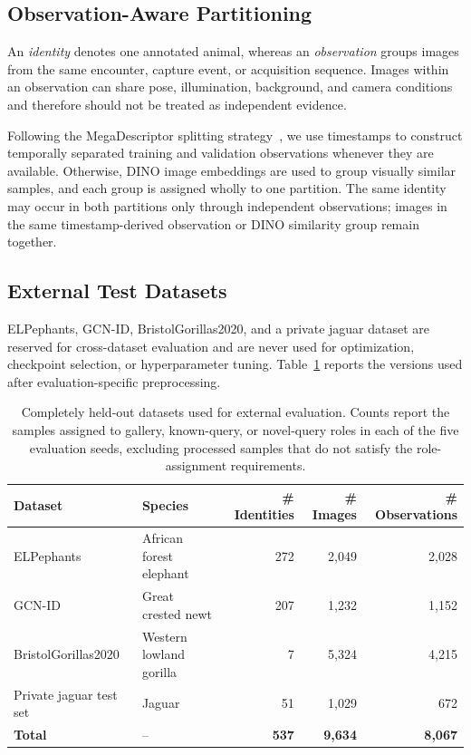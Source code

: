 \subsection{Observation-Aware Partitioning}
\label{sec:dataset:partitioning}

An \emph{identity} denotes one annotated animal, whereas an
\emph{observation} groups images from the same encounter, capture event, or
acquisition sequence. Images within an observation can share pose,
illumination, background, and camera conditions and therefore should not be
treated as independent evidence.

Following the MegaDescriptor splitting strategy~\cite{vcermak2024wildlifedatasets},
we use timestamps to construct temporally separated training and validation
observations whenever they are available. Otherwise, DINO image embeddings are
used to group visually similar samples, and each group is assigned wholly to
one partition. The same identity may occur in both partitions only through
independent observations; images in the same timestamp-derived observation or
DINO similarity group remain together.

\subsection{External Test Datasets}
\label{sec:dataset:test}

ELPephants, GCN-ID, BristolGorillas2020, and a private jaguar dataset are
reserved for cross-dataset evaluation and are never used for optimization,
checkpoint selection, or hyperparameter tuning.
Table~\ref{tab:apexid_test_datasets} reports the versions used after
evaluation-specific preprocessing.

\begin{table}[t]
\centering
\caption{Completely held-out datasets used for external evaluation. Counts
report the samples assigned to gallery, known-query, or novel-query roles in
each of the five evaluation seeds, excluding processed samples that do not
satisfy the role-assignment requirements.}
\label{tab:apexid_test_datasets}
\begin{tabular}{l l r r r}
\toprule
\textbf{Dataset} & \textbf{Species} & \textbf{\# Identities} &
\textbf{\# Images} & \textbf{\# Observations} \\
\midrule
ELPephants~\cite{korschens2019elpephants} & African forest elephant & 272 & 2,049 & 2,028 \\
GCN-ID~\cite{rosa2025gcnid} & Great crested newt & 207 & 1,232 & 1,152 \\
BristolGorillas2020~\cite{brookes2021bristolgorillas2020,brookes2021gorillas} & Western lowland gorilla & 7 & 5,324 & 4,215 \\
Private jaguar test set & Jaguar & 51 & 1,029 & 672 \\
\midrule
\textbf{Total} & -- & \textbf{537} & \textbf{9,634} & \textbf{8,067} \\
\bottomrule
\end{tabular}
\end{table}


